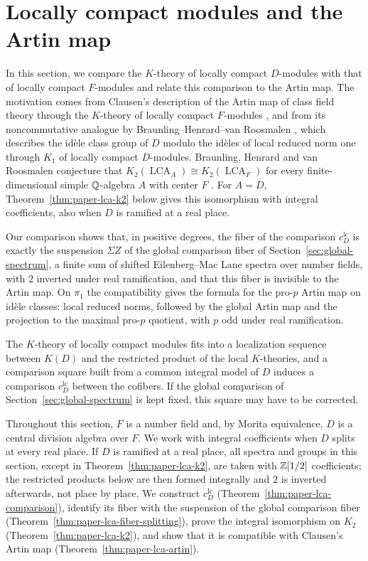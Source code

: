 \section{Locally compact modules and the Artin map}\label{sec:lca}
In this section, we compare the $K$-theory of locally compact $D$-modules with that of locally compact $F$-modules and relate this comparison to the Artin map.
The motivation comes from Clausen's description of the Artin map of class field theory through the $K$-theory of locally compact $F$-modules \cite{ClausenArtin}, and from its noncommutative analogue by Braunling--Henrard--van Roosmalen \cite{BHRAdeles}, which describes the id\`ele class group of $D$ modulo the id\`eles of local reduced norm one through $K_1$ of locally compact $D$-modules.
Braunling, Henrard and van Roosmalen conjecture that $K_2(\operatorname{LCA}_A)\cong K_2(\operatorname{LCA}_F)$ for every finite-dimensional simple $\mathbb Q$-algebra $A$ with center $F$ \cite[Conjecture 10.2]{BHRAdeles}.
For $A=D$, Theorem~\ref{thm:paper-lca-k2} below gives this isomorphism with integral coefficients, also when $D$ is ramified at a real place.

Our comparison shows that, in positive degrees, the fiber of the comparison $c^{\mathrm{lc}}_D$ is exactly the suspension $\Sigma Z$ of the global comparison fiber of Section~\ref{sec:global-spectrum}, a finite sum of shifted Eilenberg--Mac Lane spectra over number fields, with $2$ inverted under real ramification, and that this fiber is invisible to the Artin map.
On $\pi_1$ the compatibility gives the formula for the pro-$p$ Artin map on id\`ele classes: local reduced norms, followed by the global Artin map and the projection to the maximal pro-$p$ quotient, with $p$ odd under real ramification.

The $K$-theory of locally compact modules fits into a localization sequence between $K(D)$ and the restricted product of the local $K$-theories, and a comparison square built from a common integral model of $D$ induces a comparison $c^{\mathrm{lc}}_D$ between the cofibers.
If the global comparison of Section~\ref{sec:global-spectrum} is kept fixed, this square may have to be corrected.

Throughout this section, $F$ is a number field and, by Morita equivalence, $D$ is a central division algebra over $F$.
We work with integral coefficients when $D$ splits at every real place.
If $D$ is ramified at a real place, all spectra and groups in this section, except in Theorem~\ref{thm:paper-lca-k2}, are taken with $\mathbb Z[1/2]$ coefficients; the restricted products below are then formed integrally and $2$ is inverted afterwards, not place by place.
We construct $c^{\mathrm{lc}}_D$ (Theorem~\ref{thm:paper-lca-comparison}), identify its fiber with the suspension of the global comparison fiber (Theorem~\ref{thm:paper-lca-fiber-splitting}), prove the integral isomorphism on $K_2$ (Theorem~\ref{thm:paper-lca-k2}), and show that it is compatible with Clausen's Artin map (Theorem~\ref{thm:paper-lca-artin}).

